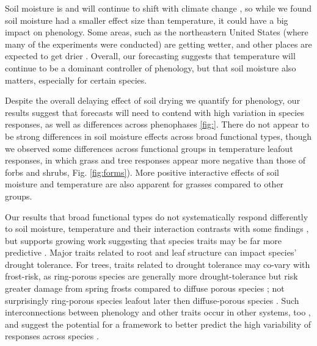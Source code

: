 \documentclass{article}
\begin{document}
\par Soil moisture is and will continue to shift with climate change \citep{berg2017}, so while we found soil moisture had a smaller effect size than temperature, it could have a big impact on phenology. Some areas, such as the northeastern United States (where many of the experiments were conducted) are getting wetter, and other places are expected to get drier \citep{berg2017}. Overall, our forecasting suggests that temperature will continue to be a dominant controller of phenology, but that soil moisture also matters, especially for certain species. 
\par Despite the overall delaying effect of soil drying we quantify for phenology, our results suggest that forecasts will need to contend with high variation in species responses, as well as differences across phenophases \ref{fig:}. There do not appear to be strong differences in soil moisture effects across broad functional types, though we observed some differences across functional groups in temperature leafout responses, in which grass and tree responses appear more negative than those of forbs and shrubs, Fig. \ref{fig:forms}). More positive interactive effects of soil moisture and temperature are also apparent for grasses compared to other groups.  
\par Our results that broad functional types do not systematically respond differently to soil moisture, temperature and their interaction contrasts with some findings \citep[e.g.,][]{rollinson2012,castillioni2022effects}, but supports growing work suggesting that species traits may be far more predictive \cite[e.g., ][]{diaz2016global}. Major traits related to root and leaf structure can impact species' drought tolerance. For trees, traits related to drought tolerance may co-vary with frost-risk, as ring-porous species are generally more drought-tolerance but risk greater damage from spring frosts compared to diffuse porous species \citep{bader2022less,wang2022contrast}; not surprisingly ring-porous species leafout later then diffuse-porous species \cite{lechowicz1984}. Such interconnections between phenology and other traits occur in other systems, too \citep[e.g.,][]{ocheltree2020identification}, and suggest the potential for a framework to better predict the high variability of responses across species \citep[e.g.,][]{morales2024phylogenetic}.
\end{document}
